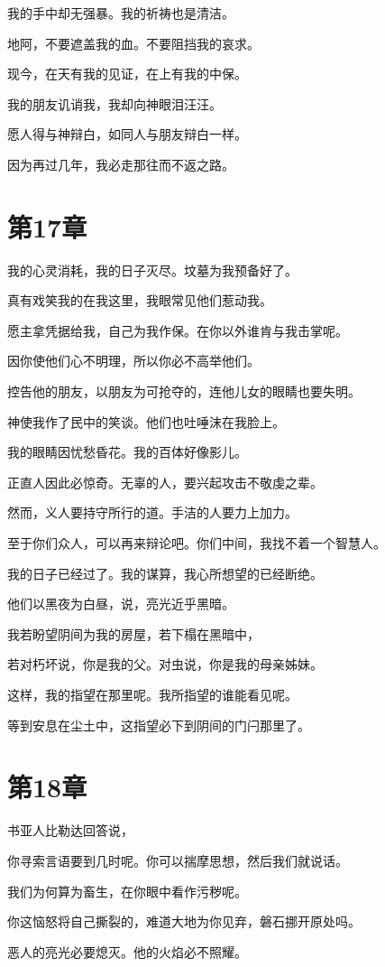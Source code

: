 \documentclass[12pt,oneside]{book}
\begin{document}
我的手中却无强暴。我的祈祷也是清洁。

地阿，不要遮盖我的血。不要阻挡我的哀求。

现今，在天有我的见证，在上有我的中保。

我的朋友讥诮我，我却向神眼泪汪汪。

愿人得与神辩白，如同人与朋友辩白一样。

因为再过几年，我必走那往而不返之路。


\chapter{第17章}
我的心灵消耗，我的日子灭尽。坟墓为我预备好了。

真有戏笑我的在我这里，我眼常见他们惹动我。

愿主拿凭据给我，自己为我作保。在你以外谁肯与我击掌呢。

因你使他们心不明理，所以你必不高举他们。

控告他的朋友，以朋友为可抢夺的，连他儿女的眼睛也要失明。

神使我作了民中的笑谈。他们也吐唾沫在我脸上。

我的眼睛因忧愁昏花。我的百体好像影儿。

正直人因此必惊奇。无辜的人，要兴起攻击不敬虔之辈。

然而，义人要持守所行的道。手洁的人要力上加力。

至于你们众人，可以再来辩论吧。你们中间，我找不着一个智慧人。

我的日子已经过了。我的谋算，我心所想望的已经断绝。

他们以黑夜为白昼，说，亮光近乎黑暗。

我若盼望阴间为我的房屋，若下榻在黑暗中，

若对朽坏说，你是我的父。对虫说，你是我的母亲姊妹。

这样，我的指望在那里呢。我所指望的谁能看见呢。

等到安息在尘土中，这指望必下到阴间的门闩那里了。


\chapter{第18章}
书亚人比勒达回答说，

你寻索言语要到几时呢。你可以揣摩思想，然后我们就说话。

我们为何算为畜生，在你眼中看作污秽呢。

你这恼怒将自己撕裂的，难道大地为你见弃，磐石挪开原处吗。

恶人的亮光必要熄灭。他的火焰必不照耀。
\end{document}
